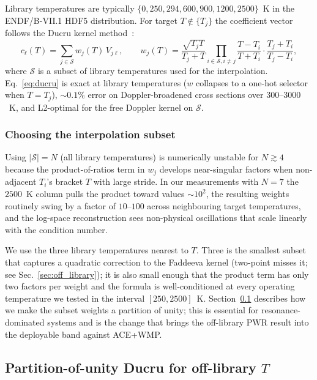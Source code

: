 Library temperatures are typically $\{0, 250, 294, 600, 900,
1200, 2500\}$~K in the ENDF/B-VII.1 HDF5 distribution. For
target $T \not\in \{T_j\}$ the coefficient vector follows
the Ducru kernel method~\cite{ducru2017}:
\begin{equation}
c_\ell(T) = \sum_{j \in \mathcal{S}} w_j(T)\, V_{j\ell},
\qquad
w_j(T) = \frac{\sqrt{T_j T}}{T_j + T}
\prod_{i \in \mathcal{S}, i \neq j}
\frac{T - T_i}{T + T_i} \cdot \frac{T_j + T_i}{T_j - T_i},
\label{eq:ducru}
\end{equation}
where $\mathcal{S}$ is a subset of library temperatures used
for the interpolation. Eq.~\ref{eq:ducru} is exact at library
temperatures ($w$ collapses to a one-hot selector when
$T = T_j$), $\sim\!0.1\%$ error on Doppler-broadened cross
sections over $300$--$3000$~K, and L2-optimal for the free
Doppler kernel on $\mathcal{S}$.

\subsubsection*{Choosing the interpolation subset}

Using $|\mathcal{S}| = N$ (all library temperatures) is
numerically unstable for $N \gtrsim 4$ because the
product-of-ratios term in $w_j$ develops near-singular
factors when non-adjacent $T_i$'s bracket $T$ with large
stride. In our measurements with $N = 7$ the $2500$~K column
pulls the product toward values $\sim\!10^{2}$, the resulting
weights routinely swing by a factor of $10$--$100$ across
neighbouring target temperatures, and the log-space
reconstruction sees non-physical oscillations that scale
linearly with the condition number.

We use the three library temperatures nearest to $T$.
Three is the smallest subset that captures a quadratic
correction to the Faddeeva kernel (two-point misses it; see
Sec.~\ref{sec:off_library}); it is also small enough that
the product term has only two factors per weight and the
formula is well-conditioned at every operating temperature
we tested in the interval $[250, 2500]$~K. Section~\ref{sec:ducru_puoi}
describes how we make the subset weights a partition of
unity; this is essential for resonance-dominated systems
and is the change that brings the off-library PWR result
into the deployable band against ACE+WMP.

\subsection{Partition-of-unity Ducru for off-library \texorpdfstring{$T$}{T}}
\label{sec:ducru_puoi}

